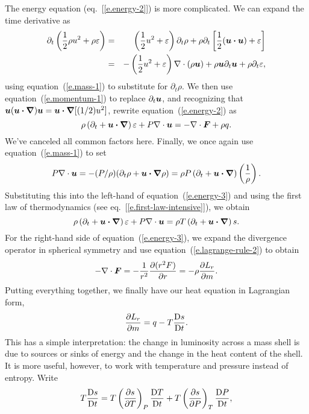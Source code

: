The energy equation (eq.~[\ref{e.energy-2}]) is more complicated. We can expand the time derivative as
\begin{eqnarray*}
	\partial_{t} \left( \frac{1}{2}\rho u^{2} + \rho \varepsilon \right) 
	&=& \left(\frac{1}{2}u^{2} + \varepsilon\right)\partial_{t}\rho + \rho\partial_{t}\left[\frac{1}{2}(\boldsymbol{u}\boldsymbol{\cdot}\boldsymbol{u}) + \varepsilon\right]\\
	&=& -\left(\frac{1}{2}u^{2} + \varepsilon\right)\nabla \cdot\left(\rho\boldsymbol{u}\right) + \rho \boldsymbol{u}\partial_{t}\boldsymbol{u} + \rho\partial_{t}\varepsilon,
\end{eqnarray*}
using equation~(\ref{e.mass-1}) to substitute for $\partial_{t}\rho$.  We then use equation~(\ref{e.momentum-1}) to replace $\partial_{t}\boldsymbol{u}$, and recognizing that $\boldsymbol{u}(\boldsymbol{u}\boldsymbol{\cdot}\boldsymbol{\nabla})\boldsymbol{u} = \boldsymbol{u}\boldsymbol{\cdot}\boldsymbol{\nabla}[(1/2)u^{2}]$, rewrite equation~(\ref{e.energy-2}) as
\begin{equation}\label{e.energy-3}
	\rho\left(\partial_{t} + \boldsymbol{u}\boldsymbol{\cdot}\boldsymbol{\nabla}\right) \varepsilon + P\nabla \cdot\boldsymbol{u} = -\nabla \cdot\boldsymbol{F} + \rho q.
\end{equation}
We've canceled all common factors here.  Finally, we once again use equation~(\ref{e.mass-1}) to set 
\[
	P\nabla \cdot\boldsymbol{u} = -(P/\rho)(\partial_{t}\rho + \boldsymbol{u}\boldsymbol{\cdot}\boldsymbol{\nabla} \rho) 
	= \rho P\left(\partial_{t} + \boldsymbol{u}\boldsymbol{\cdot}\boldsymbol{\nabla}\right)\left(\frac{1}{\rho}\right).
\]
Substituting this into the left-hand of equation~(\ref{e.energy-3})  and using the first law of thermodynamics (see eq.~[\ref{e.first-law-intensive}]), we obtain
\begin{equation}
\rho\left(\partial_{t} + \boldsymbol{u}\boldsymbol{\cdot}\boldsymbol{\nabla}\right) \varepsilon + P\nabla \cdot\boldsymbol{u} = \rho T \left(\partial_{t} + \boldsymbol{u}\boldsymbol{\cdot}\boldsymbol{\nabla}\right) s.
\end{equation}
For the right-hand side of equation~(\ref{e.energy-3}), we expand the divergence operator in spherical symmetry and use equation~(\ref{e.lagrange-rule-2}) to obtain
\[
	-\nabla \cdot\boldsymbol{F} = -\frac{1}{r^{2}}\frac{\partial(r^{2} F)}{\partial r} = -\rho\frac{\partial L_{r}}{\partial m}.
\]
Putting everything together, we finally have our heat equation in Lagrangian form,
\begin{equation}\label{e.lagrange-heat}
	\frac{\partial L_{r}}{\partial m} = q - T\frac{\mathrm{D} s}{\mathrm{D} t}.
\end{equation}
This has a simple interpretation: the change in luminosity across a mass shell is due to sources or sinks of energy and the change in the heat content of the shell.  It is more useful, however, to work with temperature and pressure instead of entropy.  Write
\[
	T\frac{\mathrm{D} s}{\mathrm{D} t} = T\left(\frac{\partial s}{\partial T}\right)_{P}\frac{\mathrm{D} T}{\mathrm{D} t} + T\left(\frac{\partial s}{\partial P}\right)_{T}\frac{\mathrm{D} P}{\mathrm{D} t},
\]

